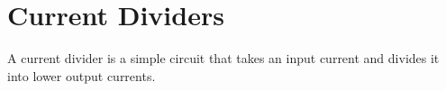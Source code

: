 \section{Current Dividers}
A current divider is a simple circuit that takes an input
current and divides it into lower output currents.




